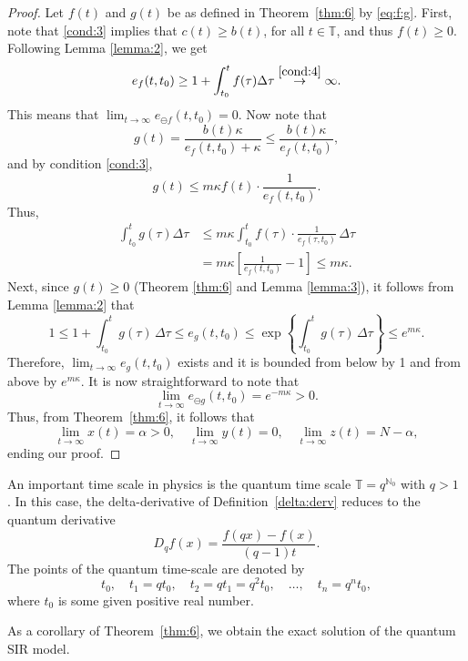 \documentclass[pdflatex,sn-mathphys-num]{sn-jnl}
\theoremstyle{remark}
\begin{document}
\begin{proof}
Let $f(t)$ and $g(t)$ be as defined in Theorem~\ref{thm:6}
by \eqref{eq:f:g}. First, note that 
\eqref{cond:3} implies that $c(t) \geq b(t)$, for all $t \in \mathbb{T}$, 
and thus $f(t) \geq 0$. Following Lemma \ref{lemma:2}, we get
$$
e_f(t,t_0) \geq 1 + \int_{t_0}^t f(\tau) \Delta\tau 
\overset{\eqref{cond:4}}{\rightarrow} \infty.
$$
This means that
$\displaystyle \lim_{t\rightarrow \infty} e_{\ominus f}(t,t_0) = 0$. 
Now note that 
$$
g(t) = \frac{b(t)\kappa}{e_{f}(t,t_0) + \kappa}
\leq \frac{b(t)\kappa}{e_{f}(t,t_0)},
$$
and by condition \eqref{cond:3}, 
$$
g(t) \leq m\kappa f(t) \cdot 
\frac{1}{e_{f}(t,t_0)}.
$$
Thus, 
\begin{equation*}
\begin{aligned}
\int_{t_0}^t g(\tau) \Delta\tau 
&\leq m\kappa \int_{t_0}^{t} f(\tau)
\cdot \frac{1}{e_{f}(\tau,t_0)}\,\Delta\tau\\
&= m\kappa \left[\frac{1}{e_{f}(t,t_0)} - 1\right]
\leq m\kappa.
\end{aligned}
\end{equation*} 
Next, since $g(t) \geq 0$ (Theorem \ref{thm:6} and Lemma \ref{lemma:3}), it 
follows from Lemma \ref{lemma:2} that
$$
1 \leq 1 + \int_{t_0}^t g(\tau)\,\Delta\tau \leq e_g(t,t_0)
\leq \exp\left\{\int_{t_0}^t g(\tau)\,\Delta\tau\right\} \leq e^{m\kappa}.
$$ 
Therefore, $\lim_{t \rightarrow \infty} e_g(t,t_0)$ exists and it is bounded 
from below by 1 and from above by $e^{m\kappa}$. It is now straightforward to 
note that 
$$
\lim_{t \rightarrow \infty} e_{\ominus g}(t,t_0) = e^{-m\kappa} > 0.
$$
Thus, from Theorem~\ref{thm:6}, it follows that
$$
\lim_{t \rightarrow \infty} x(t) = \alpha > 0,\quad 
\lim_{t \rightarrow \infty} y(t) = 0,\quad
\lim_{t \rightarrow \infty} z(t) = N - \alpha,
$$
ending our proof. 
\end{proof}

An important time scale in physics is the quantum time scale
$\mathbb{T} = q^{\mathbb{N}_0}$ with $q > 1$ \cite{quantum:calculus}.
In this case, the delta-derivative of Definition~\ref{delta:derv}
reduces to the quantum derivative  
$$
D_qf(x) = \frac{f(qx) - f(x)}{(q-1)t}.
$$
The points of the quantum time-scale are denoted by
\begin{equation}
\label{remark:2}
t_0, \quad t_1 = qt_0, \quad t_2 = qt_1 = q^2t_0,\quad \ldots, \quad t_n = q^nt_0,
\end{equation}
where $t_0$ is some given positive real number.

As a corollary of Theorem~\ref{thm:6}, we obtain the exact solution of 
the quantum SIR model. 
\end{document}
